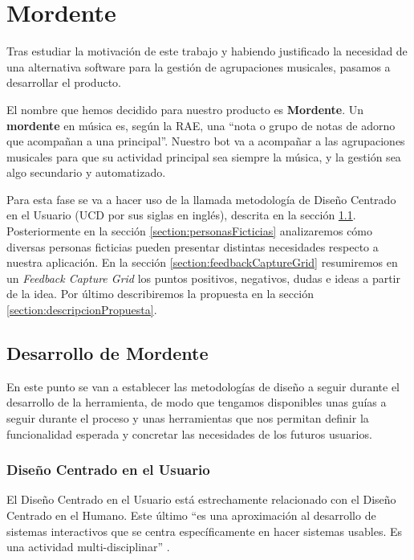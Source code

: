 \chapter{Mordente}

Tras estudiar la motivación de este trabajo y habiendo justificado la necesidad de una alternativa software para la gestión de agrupaciones musicales, pasamos a desarrollar el producto. 

El nombre que hemos decidido para nuestro producto es \textbf{Mordente}. Un \textbf{mordente} en música es, según la RAE, una ``nota o grupo de notas de adorno que acompañan a una principal''. Nuestro bot va a acompañar a las agrupaciones musicales para que su actividad principal sea siempre la música, y la gestión sea algo secundario y automatizado.

Para esta fase se va a hacer uso de la llamada metodología de Diseño Centrado en el Usuario (UCD por sus siglas en inglés), descrita en la sección \ref{section:desarrolloMordente}. Posteriormente en la sección \ref{section:personasFicticias} analizaremos cómo diversas personas ficticias pueden presentar distintas necesidades respecto a nuestra aplicación. En la sección \ref{section:feedbackCaptureGrid} resumiremos en un \textit{Feedback Capture Grid} los puntos positivos, negativos, dudas e ideas a partir de la idea. Por último describiremos la propuesta en la sección \ref{section:descripcionPropuesta}.

\section{Desarrollo de Mordente}\label{section:desarrolloMordente}

En este punto se van a establecer las metodologías de diseño a seguir durante el desarrollo de la herramienta, de modo que tengamos disponibles unas guías a seguir durante el proceso y unas herramientas que nos permitan definir la funcionalidad esperada y concretar las necesidades de los futuros usuarios.

\subsection{Diseño Centrado en el Usuario}

El Diseño Centrado en el Usuario está estrechamente relacionado con el Diseño Centrado en el Humano\cite{w3UCD}. Este último ``es una aproximación al desarrollo de sistemas interactivos que se centra específicamente en hacer sistemas usables. Es una actividad multi-disciplinar'' \cite{isoHCD}.

